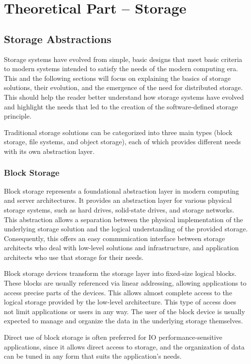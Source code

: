 \chapter{Theoretical Part -- Storage}\label{ch:storage_theory}
\section{Storage Abstractions}
Storage systems have evolved from simple, basic designs that meet basic criteria to modern systems intended to satisfy the needs of the modern computing era. This and the following sections will focus on explaining the basics of storage solutions, their evolution, and the emergence of the need for distributed storage. This should help the reader better understand how storage systems have evolved and highlight the needs that led to the creation of the software-defined storage principle.

Traditional storage solutions can be categorized into three main types (block storage, file systems, and object storage), each of which provides different needs with its own abstraction layer.

\subsection{Block Storage}
Block storage represents a foundational abstraction layer in modern computing and server architectures. It provides an abstraction layer for various physical storage systems, such as hard drives, solid-state drives, and storage networks. This abstraction allows a separation between the physical implementation of the underlying storage solution and the logical understanding of the provided storage. Consequently, this offers an easy communication interface between storage architects who deal with low-level solutions and infrastructure, and application architects who use that storage for their needs.

Block storage devices transform the storage layer into fixed-size logical blocks. These blocks are usually referenced via linear addressing, allowing applications to access precise parts of the devices. This allows almost complete access to the logical storage provided by the low-level architecture. This type of access does not limit applications or users in any way. The user of the block device is usually expected to manage and organize the data in the underlying storage themselves.

Direct use of block storage is often preferred for IO performance-sensitive applications, since it allows direct access to storage, and the organization of data can be tuned in any form that suits the application's needs.

